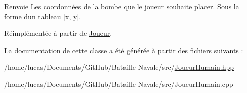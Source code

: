\begin{DoxyReturn}{Renvoie}
Les coordonnées de la bombe que le joueur souhaite placer. Sous la forme d\textquotesingle{}un tableau \mbox{[}x, y\mbox{]}. 
\end{DoxyReturn}


Réimplémentée à partir de \hyperlink{class_joueur_a46bdd92b73a1f0d04aeb5f19f33720b0}{Joueur}.



La documentation de cette classe a été générée à partir des fichiers suivants \+:\begin{DoxyCompactItemize}
\item 
/home/lucas/\+Documents/\+Git\+Hub/\+Bataille-\/\+Navale/src/\hyperlink{_joueur_humain_8hpp}{Joueur\+Humain.\+hpp}\item 
/home/lucas/\+Documents/\+Git\+Hub/\+Bataille-\/\+Navale/src/Joueur\+Humain.\+cpp\end{DoxyCompactItemize}
